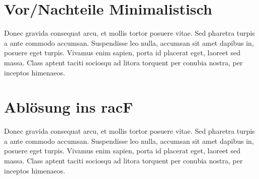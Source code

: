 \section{Vor/Nachteile Minimalistisch}
\label{sec:chapter05:Minimalistisch}
Donec gravida consequat arcu, et mollis tortor posuere vitae. Sed pharetra turpis a ante commodo accumsan. Suspendisse leo nulla, accumsan sit amet dapibus in, posuere eget turpis. Vivamus enim sapien, porta id placerat eget, laoreet sed massa. Class aptent taciti sociosqu ad litora torquent per conubia nostra, per inceptos himenaeos.

\section{Ablösung ins racF}
\label{sec:chapter05:racF}
Donec gravida consequat arcu, et mollis tortor posuere vitae. Sed pharetra turpis a ante commodo accumsan. Suspendisse leo nulla, accumsan sit amet dapibus in, posuere eget turpis. Vivamus enim sapien, porta id placerat eget, laoreet sed massa. Class aptent taciti sociosqu ad litora torquent per conubia nostra, per inceptos himenaeos.

